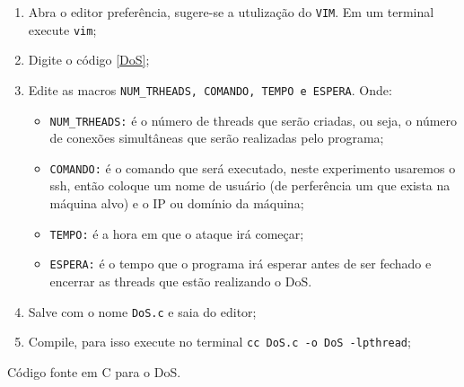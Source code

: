 \documentclass[12pt]{abnt}
\begin{document}
\begin{enumerate}

	\item Abra o editor preferência, sugere-se a utulização do \texttt{VIM}. Em um terminal execute \texttt{vim};
	\item Digite o código \ref{DoS};
	\item Edite as macros \texttt{NUM\_TRHEADS, COMANDO, TEMPO e ESPERA}. Onde:
		\begin{itemize}
		
			\item \texttt{NUM\_TRHEADS:} é o número de threads que serão criadas, ou seja,
			o número de conexões simultâneas que serão realizadas pelo programa;

			\item \texttt{COMANDO:} é o comando que será executado, neste experimento usaremos o ssh,
			então coloque um nome de usuário (de perferência um que exista na máquina alvo) e o IP ou
			domínio da máquina;

			\item \texttt{TEMPO:} é a hora em que o ataque irá começar;

			\item \texttt{ESPERA:} é o tempo que o programa irá esperar antes de ser fechado e encerrar
			as threads que estão realizando o  DoS.

		\end{itemize}

	\item Salve com o nome \texttt{DoS.c} e saia do editor;
	\item Compile, para isso execute no terminal \texttt{cc DoS.c -o DoS -lpthread};

\end{enumerate}

%	

\renewcommand{\baselinestretch}{0.5}  %
\begin{codigo}[!hbt]
   \tiny  %
   \caption{Código fonte em C para o DoS.}
   \label{DoS}
\end{codigo}

\clearpage
\end{document}
